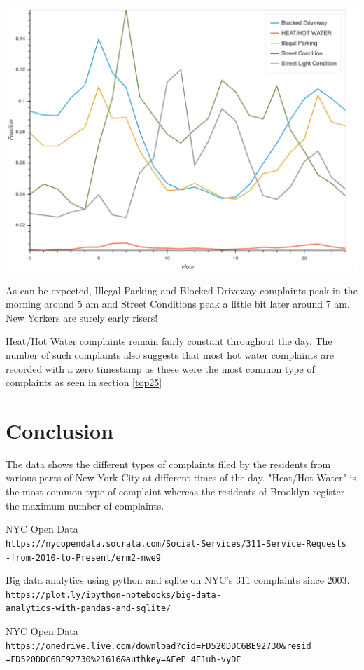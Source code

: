 \documentclass[12pt,a4paper]{article}
\begin{document}
\includegraphics[scale=0.2]{timeseries}

As can be expected, Illegal Parking and Blocked Driveway complaints peak in the morning around 5 am and Street Conditions peak a little bit later around 7 am. New Yorkers are surely early risers!

Heat/Hot Water complaints remain fairly constant throughout the day. The number of such complaints also suggests that most hot water complaints are recorded with a zero timestamp as these were the most common type of complaints as seen in section \ref{top25}

\section{Conclusion}
The data shows the different types of complaints filed by the residents from various parts of New York City at different times of the day. "Heat/Hot Water" is the most common type of complaint whereas the residents of Brooklyn register the maximum number of complaints.

\begin{thebibliography}{9}
NYC Open Data
\\\texttt{https://nycopendata.socrata.com/Social-Services/311-Service-Requests\\-from-2010-to-Present/erm2-nwe9}


Big data analytics using python and sqlite on NYC's 311 complaints since 2003.
\\\texttt{https://plot.ly/ipython-notebooks/big-data-\\analytics-with-pandas-and-sqlite/}

NYC Open Data
\\\texttt{https://onedrive.live.com/download?cid=FD520DDC6BE92730\&resid\\=FD520DDC6BE92730\%21616\&authkey=AEeP\_4E1uh-vyDE}


\end{thebibliography}
\end{document}
